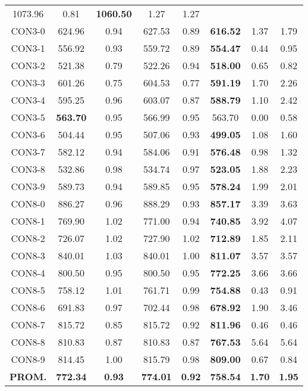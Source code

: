 \begin{table}[ht]
\begin{tabular}{c c c c c c c c}
1073.96 & 0.81 & \bf{1060.50} & 
1.27 & 1.27\\CON3-0 & 624.96 & 0.94 & 
627.53 & 0.89 & \bf{616.52} & 
1.37 & 1.79\\CON3-1 & 556.92 & 0.93 & 
559.72 & 0.89 & \bf{554.47} & 
0.44 & 0.95\\CON3-2 & 521.38 & 0.79 & 
522.26 & 0.94 & \bf{518.00} & 
0.65 & 0.82\\CON3-3 & 601.26 & 0.75 & 
604.53 & 0.77 & \bf{591.19} & 
1.70 & 2.26\\CON3-4 & 595.25 & 0.96 & 
603.07 & 0.87 & \bf{588.79} & 
1.10 & 2.42\\CON3-5 & \bf{563.70} & 0.95 & 
566.99 & 0.95 & 563.70 & 0.00
 & 0.58\\CON3-6 & 504.44 & 0.95 & 
507.06 & 0.93 & \bf{499.05} & 
1.08 & 1.60\\CON3-7 & 582.12 & 0.94 & 
584.06 & 0.91 & \bf{576.48} & 
0.98 & 1.32\\CON3-8 & 532.86 & 0.98 & 
534.74 & 0.97 & \bf{523.05} & 
1.88 & 2.23\\CON3-9 & 589.73 & 0.94 & 
589.85 & 0.95 & \bf{578.24} & 
1.99 & 2.01\\CON8-0 & 886.27 & 0.96 & 
888.29 & 0.93 & \bf{857.17} & 
3.39 & 3.63\\CON8-1 & 769.90 & 1.02 & 
771.00 & 0.94 & \bf{740.85} & 
3.92 & 4.07\\CON8-2 & 726.07 & 1.02 & 
727.90 & 1.02 & \bf{712.89} & 
1.85 & 2.11\\CON8-3 & 840.01 & 1.03 & 
840.01 & 1.00 & \bf{811.07} & 
3.57 & 3.57\\CON8-4 & 800.50 & 0.95 & 
800.50 & 0.95 & \bf{772.25} & 
3.66 & 3.66\\CON8-5 & 758.12 & 1.01 & 
761.71 & 0.99 & \bf{754.88} & 
0.43 & 0.91\\CON8-6 & 691.83 & 0.97 & 
702.44 & 0.98 & \bf{678.92} & 
1.90 & 3.46\\CON8-7 & 815.72 & 0.85 & 
815.72 & 0.92 & \bf{811.96} & 
0.46 & 0.46\\CON8-8 & 810.83 & 0.87 & 
810.83 & 0.87 & \bf{767.53} & 
5.64 & 5.64\\CON8-9 & 814.45 & 1.00 & 
815.79 & 0.98 & \bf{809.00} & 
0.67 & 0.84\\\bf{PROM.} & 
\bf{772.34} & \bf{0.93} & \bf{774.01} & \bf{0.92} & \bf{758.54} & \bf{1.70} & \bf{1.95}\\[1ex]\hline
\end{tabular}
\label{table:nonlin}
\end{table} 

